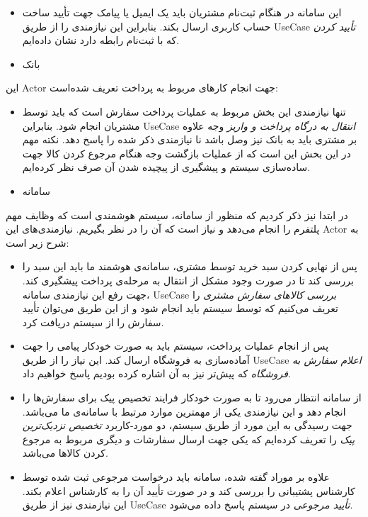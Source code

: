 \documentclass[]{article}
\begin{document}
\begin{itemize}
\item
  این سامانه در هنگام ثبت‌نام مشتریان باید یک ایمیل یا پیامک جهت تأیید
  ساخت حساب کاربری ارسال بکند. بنابراین این نیازمندی را از طریق UseCase
  \emph{تأیید کردن} که با ثبت‌نام رابطه دارد نشان داده‌ایم.
\end{itemize}

\begin{itemize}
\item
  بانک
\end{itemize}

این Actor جهت انجام کارهای مربوط به پرداخت تعریف شده‌است:

\begin{itemize}
\item
  تنها نیازمندی این بخش مربوط به عملیات پرداخت سفارش است که باید توسط
  مشتریان انجام شود. بنابراین UseCase \emph{انتقال به درگاه پرداخت و
  واریز} وجه علاوه بر مشتری باید به بانک نیز وصل باشد نا نیازمندی ذکر
  شده را پاسخ دهد. نکته مهم در این بخش این است که از عملیات بازگشت وجه
  هنگام مرجوع کردن کالا جهت ساده‌سازی سیستم و پیشگیری از پیچیده شدن آن
  صرف نظر کرده‌ایم.
\end{itemize}

\begin{itemize}
\item
  سامانه
\end{itemize}

در ابتدا نیز ذکر کردیم که منظور از سامانه، سیستم هوشمندی است که وظایف
مهم پلتفرم را انجام می‌دهد و نیاز است که آن را در نظر بگیریم.
نیازمندی‌های این Actor به شرح زیر است:

\begin{itemize}
\item
  پس از نهایی کردن سبد خرید توسط مشتری، سامانه‌ی هوشمند ما باید این سبد
  را بررسی کند تا در صورت وجود مشکل از انتقال به مرحله‌ی پرداخت پیشگیری
  کند. جهت رفع این نیازمندی سامانه، UseCase \emph{بررسی کالاهای سفارش
  مشتری} را تعریف می‌کنیم که توسط سیستم باید انجام شود و از این طریق
  می‌توان تأیید سفارش را از سیستم دریافت کرد.
\item
  پس از انجام عملیات پرداخت، سیستم باید به صورت خودکار پیامی را جهت
  آماده‌سازی به فروشگاه ارسال کند. این نیاز را از طریق UseCase
  \emph{اعلام سفارش به فروشگاه} که پیش‌تر نیز به آن اشاره کرده بودیم
  پاسخ خواهیم داد.
\item
  از سامانه انتظار می‌رود تا به صورت خودکار فرایند تخصیص پیک برای
  سفارش‌ها را انجام دهد و این نیازمندی یکی از مهمترین موارد مرتبط با
  سامانه‌ی ما می‌باشد. جهت رسیدگی به این مورد از طریق سیستم، دو
  مورد-کاربرد \emph{تخصیص نزدیک‌ترین پیک} را تعریف کرده‌ایم که یکی جهت
  ارسال سفارشات و دیگری مربوط به مرجوع کردن کالاها می‌باشد.
\item
  علاوه بر موراد گفته شده، سامانه باید درخواست مرجوعی ثبت شده توسط
  کارشناس پشتیبانی را بررسی کند و در صورت تأیید آن را به کارشناس اعلام
  بکند. این نیازمندی نیز از طریق UseCase \emph{تأیید مرجوعی} در سیستم
  پاسخ داده می‌شود.
\end{itemize}
\end{document}
